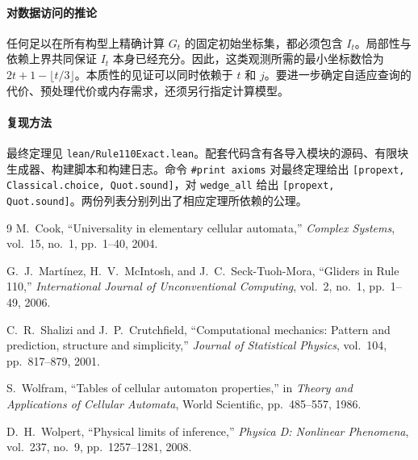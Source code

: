 \documentclass[11pt, a4paper]{article}
\begin{document}
\paragraph{对数据访问的推论}
任何足以在所有构型上精确计算 $G_t$ 的固定初始坐标集，都必须包含 $I_t$。局部性与依赖上界共同保证 $I_t$ 本身已经充分。因此，这类观测所需的最小坐标数恰为 $2t+1-\lfloor t/3\rfloor$。本质性的见证可以同时依赖于 $t$ 和 $j$。要进一步确定自适应查询的代价、预处理代价或内存需求，还须另行指定计算模型。

\paragraph{复现方法}
最终定理见 \texttt{lean/Rule110Exact.lean}。配套代码含有各导入模块的源码、有限块生成器、构建脚本和构建日志。命令 \texttt{\#print axioms} 对最终定理给出 \texttt{[propext, Classical.choice, Quot.sound]}，对 \texttt{wedge\_all} 给出 \texttt{[propext, Quot.sound]}。两份列表分别列出了相应定理所依赖的公理。

\clearpage
\begin{thebibliography}{9}
M.~Cook, ``Universality in elementary cellular automata,'' \emph{Complex Systems}, vol.~15, no.~1, pp.~1--40, 2004.

G.~J.~Mart\'inez, H.~V.~McIntosh, and J.~C.~Seck-Tuoh-Mora, ``Gliders in Rule 110,'' \emph{International Journal of Unconventional Computing}, vol.~2, no.~1, pp.~1--49, 2006.

C.~R.~Shalizi and J.~P.~Crutchfield, ``Computational mechanics: Pattern and prediction, structure and simplicity,'' \emph{Journal of Statistical Physics}, vol.~104, pp.~817--879, 2001.

S.~Wolfram, ``Tables of cellular automaton properties,'' in \emph{Theory and Applications of Cellular Automata}, World Scientific, pp.~485--557, 1986.

D.~H.~Wolpert, ``Physical limits of inference,'' \emph{Physica D: Nonlinear Phenomena}, vol.~237, no.~9, pp.~1257--1281, 2008.
\end{thebibliography}
\end{document}

